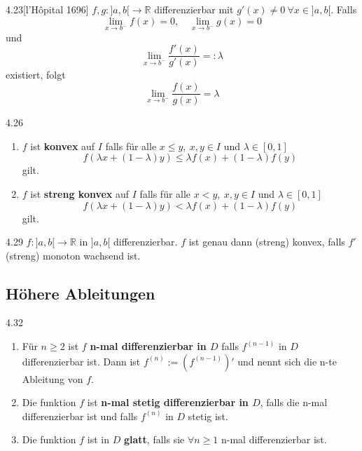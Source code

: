 \documentclass[8pt,a4paper,twocolumn,table]{extarticle}
\newcommand{\R}{\mathbb{R}}
\begin{document}
\begin{satz}{4.23}[l'Hôpital 1696]
    $f,g: ]a, b[ \to \R$ differenzierbar mit $g'(x) \ne 0\ \forall x \in ]a, b[$.
    Falls
    \[ \lim_{x \to b^-} f(x) = 0,\quad \lim_{x \to b^-} g(x) = 0 \]
    und
    \[ \lim_{x \to b^-} \frac{f'(x)}{g'(x)} =: \lambda \]
    existiert, folgt
    \[ \lim_{x \to b^-} \frac{f(x)}{g(x)} = \lambda \]
\end{satz}

\begin{definition}{4.26}
    \begin{enumerate}
        \item $f$ ist \textbf{konvex} auf $I$ falls für alle $x \le y,\ x,y \in I$ und $\lambda \in [0,1]$
              \[ f(\lambda x + (1 - \lambda)y) \le \lambda f(x) + (1 - \lambda)f(y) \]
              gilt.
        \item $f$ ist \textbf{streng konvex} auf $I$ falls für alle $x < y,\ x,y \in I$ und $\lambda \in [0,1]$
              \[ f(\lambda x + (1 - \lambda)y) < \lambda f(x) + (1 - \lambda)f(y) \]
              gilt.
    \end{enumerate}
\end{definition}

\begin{satz}{4.29}
    $f: ]a, b[ \to \R$ in $]a, b[$ differenzierbar. $f$ ist genau dann (streng) konvex, falls $f'$ (streng) monoton wachsend ist.
\end{satz}

\subsection{Höhere Ableitungen}

\begin{definition}{4.32}
    \begin{enumerate}
        \item Für $n \ge 2$ ist $f$ \textbf{n-mal differenzierbar in $D$} falls $f^{(n-1)}$ in $D$ differenzierbar ist.
              Dann ist $f^(n) := (f^{(n - 1)})'$ und nennt sich die n-te Ableitung von $f$.
        \item Die funktion $f$ ist \textbf{n-mal stetig differenzierbar in $D$}, falls die n-mal differenzierbar ist und falls $f^{(n)}$ in $D$ stetig ist.
        \item Die funktion $f$ ist in $D$ \textbf{glatt}, falls sie $\forall n \ge 1$ n-mal differenzierbar ist.
    \end{enumerate}
\end{definition}
\end{document}
